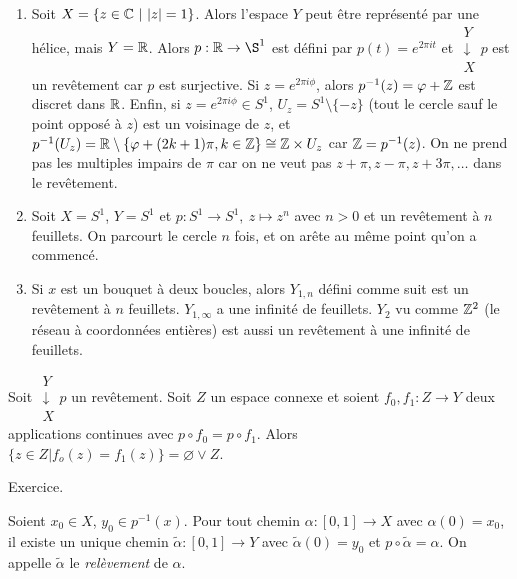   
  \begin{exs}
    \begin{enumerate}
    \item Soit $X = \{z \in \mathbb{C}\ |\ |z| = 1 \}$. Alors l'espace $Y$ peut être représenté par une hélice, mais $Y
      = \mathbb{R}$. Alors $p: \R \to \S^1$ est défini par $p(t) = e^{2\pi i t}$ et $\substack{Y\\\downarrow\\ X}p$
      est un revêtement car $p$ est surjective. Si $z = e^{2\pi i \phi}$, alors $p^{-1}(z) = \varphi + \mathbb{Z}$ est
      discret dans $\mathbb{R}$. Enfin, si $z = e^{2 \pi i \phi} \in S^1$, $U_z = S^1 \setminus \{-z\}$ (tout le
      cercle sauf le point opposé à $z$) est un voisinage de $z$, et $p^{-1}(U_z) = \mathbb{R} \setminus \{\varphi +
      (2k+1)\pi, k \in \mathbb{Z}\} \cong \mathbb{Z} \times U_z$ car $\mathbb{Z} = p^{-1}(z)$. On ne prend pas les multiples impairs
      de $\pi$ car on ne veut pas $z+\pi, z-\pi, z+3\pi, \ldots$ dans le revêtement.

    \item Soit $X = S^1$, $Y = S^1$ et $p: S^1 \to S^1,\ z \mapsto z^n$ avec $n > 0$ et un revêtement à $n$
      feuillets. On parcourt le cercle $n$ fois, et on arête au même point qu'on a commencé.

    \item Si $x$ est un bouquet à deux boucles, alors $Y_{1,n}$ défini comme suit est un revêtement à $n$
      feuillets. $Y_{1, \infty}$ a une infinité de feuillets. $Y_2$ vu comme $\mathbb{Z}^2$ (le réseau à coordonnées
      entières) est aussi un revêtement à une infinité de feuillets.
    \end{enumerate}
  \end{exs}



  \begin{lem} \label{lem:lemme-A}
    Soit $\substack{Y\\\downarrow\\ X}p$ un revêtement. Soit $Z$ un espace connexe et soient $f_0, f_1 : Z
    \to Y$ deux applications continues avec $p \circ f_0 = p \circ f_1$. Alors $\{z \in Z | f_o(z) = f_1(z)\}
    = \varnothing \lor Z$.
  \end{lem}

  \begin{preuve}
    Exercice.
  \end{preuve}

  \begin{lem}  \label{lem:lemme-B}
    Soient $x_0 \in X$, $y_0 \in p^{-1}(x)$. Pour tout chemin $\alpha: [0,1] \to X$ avec $\alpha(0) = x_0$, il
    existe un unique chemin $\tilde{\alpha} : [0,1] \to Y$ avec $\tilde{\alpha}(0) = y_0$ et $p \circ
    \tilde{\alpha} = \alpha$. On appelle $\tilde{\alpha}$ le \emph{relèvement} de $\alpha$.
  \end{lem}

